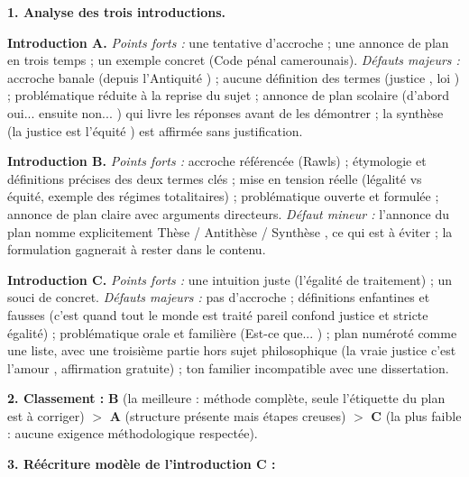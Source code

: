 \documentclass[11pt]{article}
\begin{document}
\begin{corrige}
\textbf{1. Analyse des trois introductions.}

\textbf{Introduction A.} \emph{Points forts :} une tentative d'accroche ; une annonce de plan en trois temps ; un exemple concret (Code pénal camerounais). \emph{Défauts majeurs :} accroche banale (\og depuis l'Antiquité \fg{}) ; aucune définition des termes (\og justice \fg{}, \og loi \fg{}) ; problématique réduite à la reprise du sujet ; annonce de plan scolaire (\og d'abord oui... ensuite non... \fg{}) qui livre les réponses avant de les démontrer ; la synthèse (\og la justice est l'équité \fg{}) est affirmée sans justification.

\textbf{Introduction B.} \emph{Points forts :} accroche référencée (Rawls) ; étymologie et définitions précises des deux termes clés ; mise en tension réelle (légalité vs équité, exemple des régimes totalitaires) ; problématique ouverte et formulée ; annonce de plan claire avec arguments directeurs. \emph{Défaut mineur :} l'annonce du plan nomme explicitement \og Thèse / Antithèse / Synthèse \fg{}, ce qui est à éviter ; la formulation gagnerait à rester dans le contenu.

\textbf{Introduction C.} \emph{Points forts :} une intuition juste (l'égalité de traitement) ; un souci de concret. \emph{Défauts majeurs :} pas d'accroche ; définitions enfantines et fausses (\og c'est quand tout le monde est traité pareil \fg{} confond justice et stricte égalité) ; problématique orale et familière (\og Est-ce que... \fg{}) ; plan numéroté comme une liste, avec une troisième partie hors sujet philosophique (\og la vraie justice c'est l'amour \fg{}, affirmation gratuite) ; ton familier incompatible avec une dissertation.

\textbf{2. Classement :} \textbf{B} (la meilleure : méthode complète, seule l'étiquette du plan est à corriger) $>$ \textbf{A} (structure présente mais étapes creuses) $>$ \textbf{C} (la plus faible : aucune exigence méthodologique respectée).

\textbf{3. Réécriture modèle de l'introduction C :}


\end{corrige}
\end{document}

